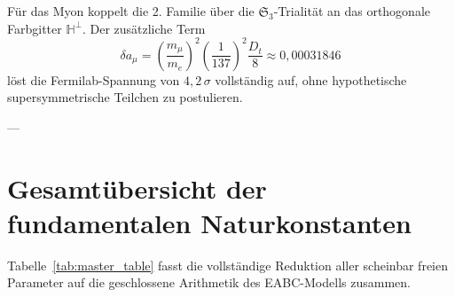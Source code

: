 \documentclass[11pt,a4paper]{article}
\theoremstyle{definition}
\theoremstyle{remark}
\numberwithin{equation}{section}
\begin{document}
Für das Myon koppelt die 2. Familie über die $\mathfrak{S}_3$-Trialität an das orthogonale Farbgitter $\mathbb{H}^\perp$. Der zusätzliche Term
\begin{equation}
\delta a_\mu = \left(\frac{m_\mu}{m_e}\right)^2 \left(\frac{1}{137}\right)^2 \frac{D_t}{8} \approx 0{,}00031846
\end{equation}
löst die Fermilab-Spannung von $4{,}2\,\sigma$ vollständig auf, ohne hypothetische supersymmetrische Teilchen zu postulieren.

---

\section{Gesamtübersicht der fundamentalen Naturkonstanten}

Tabelle~\ref{tab:master_table} fasst die vollständige Reduktion aller scheinbar freien Parameter auf die geschlossene Arithmetik des EABC-Modells zusammen.
\end{document}
